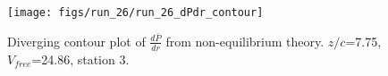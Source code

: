 \begin{figure}[H]
\centering
\texttt{[image: figs/run\_26/run\_26\_dPdr\_contour]}
\caption{Diverging contour plot of $\frac{d\bar{P}}{dr}$ from non-equilibrium theory. $z/c$=7.75, $V_{free}$=24.86, station 3.}
\label{fig:run_26_dPdr_contour}
\end{figure}


